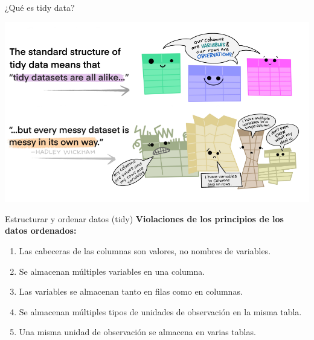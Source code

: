 \documentclass[
  ignorenonframetext,
  aspectratio=169]{beamer}
\begin{document}
\begin{frame}{¿Qué es tidy data?}
\label{quuxe9-es-tidy-data-1}
\begin{center}\includegraphics[width=0.6\linewidth]{Imgs/tidy_data} \end{center}
\end{frame}

\begin{frame}{Estructurar y ordenar datos (tidy)}
\label{estructurar-y-ordenar-datos-tidy}
\textbf{Violaciones de los principios de los datos ordenados:}

\begin{enumerate}
\item
  Las cabeceras de las columnas son valores, no nombres de variables.
\item
  Se almacenan múltiples variables en una columna.\\
\item
  Las variables se almacenan tanto en filas como en columnas.
\item
  Se almacenan múltiples tipos de unidades de observación en la misma
  tabla.
\item
  Una misma unidad de observación se almacena en varias tablas.
\end{enumerate}
\end{frame}
\end{document}
